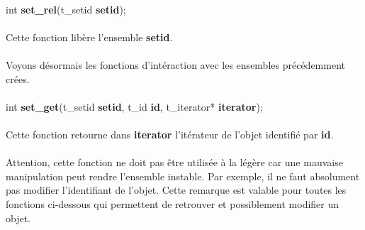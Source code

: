 \documentclass[10pt,a4wide]{article}
\begin{document}
\paragraph{}

\hspace{1.5cm}int \textbf{set\_rel}(t\_setid \textbf{setid});

\paragraph{}

Cette fonction lib\`ere l'ensemble \textbf{setid}.

\paragraph{}

Voyons d\'esormais les fonctions d'int\'eraction avec les ensembles
pr\'ec\'edemment cr\'ees.

\paragraph{}

\hspace{1.5cm}int \textbf{set\_get}(t\_setid \textbf{setid},
                                    t\_id \textbf{id},
                                    t\_iterator* \textbf{iterator});

\paragraph{}

Cette fonction retourne dans \textbf{iterator} l'it\'erateur de l'objet
identifi\'e par \textbf{id}.

\paragraph{}

Attention, cette fonction ne doit pas \^etre utilis\'ee \`a la l\'eg\`ere
car une mauvaise manipulation peut rendre l'ensemble instable. Par exemple,
il ne faut absolument pas modifier l'identifiant de l'objet. Cette remarque
est valable pour toutes les fonctions ci-dessous qui permettent de
retrouver et possiblement modifier un objet.

\paragraph{}
\end{document}
